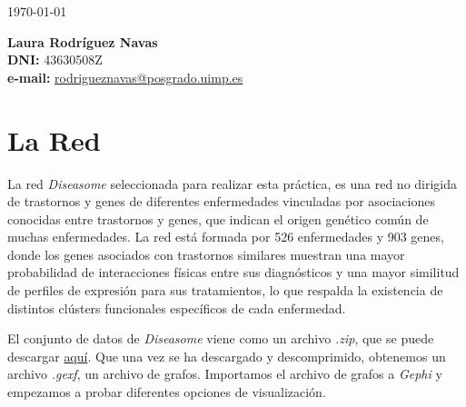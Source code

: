 \documentclass{uimppracticas}
\begin{document}
	
\frontmatter


\begin{center}
\large \today
\end{center}

\vspace{40mm}

\begin{flushright}
 	{\bf Laura Rodríguez Navas}\\
 	\textbf{DNI:} 43630508Z\\
 	\textbf{e-mail:} \href{rodrigueznavas@posgrado.uimp.es}{rodrigueznavas@posgrado.uimp.es}
\end{flushright}

\newpage



\mainmatter

\setlength\parskip{2.5ex}

\section*{La Red}

La red \textit{Diseasome}\cite{Goh8685} seleccionada para realizar esta práctica, es una red no dirigida de trastornos y genes de diferentes enfermedades vinculadas por asociaciones conocidas entre trastornos y genes, que indican el origen genético común de muchas enfermedades. La red está formada por 526 enfermedades y 903 genes, donde los genes asociados con trastornos similares muestran una mayor probabilidad de interacciones físicas entre sus diagnósticos y una mayor similitud de perfiles de expresión para sus tratamientos, lo que respalda la existencia de distintos clústers funcionales específicos de cada enfermedad. 

El conjunto de datos de \textit{Diseasome} viene como un archivo \textit{.zip}, que se puede descargar \href{http://gephi.org/datasets/diseasome.gexf.zip}{aquí}. Que una vez se ha descargado y descomprimido, obtenemos un archivo \textit{.gexf}, un archivo de grafos. Importamos el archivo de grafos a \textit{Gephi}\cite{Gephi} y empezamos a probar diferentes opciones de visualización.
\end{document}
